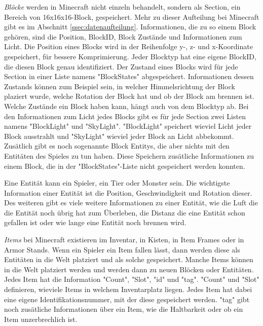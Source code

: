 \textit{Blöcke} werden in Minecraft nicht einzeln behandelt, sondern als Section, ein Bereich von 16x16x16-Block, gespeichert. Mehr zu dieser Aufteilung bei Minecraft gibt es im Abschnitt \ref{ssec:datenaufteilung}. Informationen, die zu so einem Block gehören, sind die Position, BlockID, Block Zustände und Informationen zum Licht. Die Position eines Blocks wird in der Reihenfolge y-, z- und x-Koordinate gespeichert, für bessere Komprimierung. Jeder Blocktyp hat eine eigene BlockID, die diesen Block genau identifiziert. Der Zustand eines Blocks wird für jede Section in einer Liste namens "BlockStates" abgespeichert. Informationen dessen Zustands können zum Beispiel sein, in welcher Himmelsrichtung der Block plaziert wurde, welche Rotation der Block hat und ob der Block am brennen ist. Welche Zustände ein Block haben kann, hängt auch von dem Blocktyp ab.\cite{minecraftBlockStates} Bei den Informationen zum Licht jedes Blocks gibt es für jede Section zwei Listen namens "BlockLight" und "SkyLight". "BlockLight" speichert wieviel Licht jeder Block ausstrahlt und "SkyLight" wieviel jeder Block an Licht abbekommt. Zusätlich gibt es noch sogenannte Block Entitys, die aber nichts mit den Entitäten des Spieles zu tun haben. Diese Speichern zusätliche Informationen zu einem Block, die in der "BlockStates"-Liste nicht gespeichert werden konnten.\cite{minecraftChunkFormat}

Eine Entität kann ein Spieler, ein Tier oder Monster sein. Die wichtigste Information einer Entität ist die Position, Geschwindigkeit und Rotation dieser. Des weiteren gibt es viele weitere Informationen zu einer Entität, wie die Luft die die Entität noch übrig hat zum Überleben, die Distanz die eine Entität schon gefallen ist oder wie lange eine Entität noch brennen wird.\cite{minecraftEntityFormat}

\textit{Items} bei Minecraft existieren im Inventar, in Kisten, in Item Frames oder in Armor Stands. Wenn ein Spieler ein Item fallen lässt, dann werden diese als Entitäten in die Welt platziert und als solche gespeichert. Manche Items können in die Welt platziert werden und werden dann zu neuen Blöcken oder Entitäten. Jedes Item hat die Information "Count", "Slot", "id" und "tag". "Count" und "Slot" definieren, wieviele Items in welchem Inventarplatz liegen. Jedes Item hat dabei eine eigene Identifikationsnummer, mit der diese gespeichert werden. "tag" gibt noch zusätliche Informationen über ein Item, wie die Haltbarkeit oder ob ein Item unzerbrechlich ist.
\cite{minecraftPlayerdatFormat}
\cite{minecraftItem}

